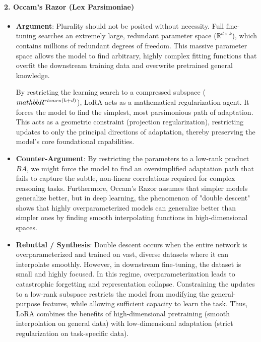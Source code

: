 \documentclass{article}
\begin{document}
\paragraph{2. Occam's Razor (Lex Parsimoniae)}
\begin{itemize}
  \item \textbf{Argument}: Plurality should not be posited without necessity. Full fine-tuning searches an extremely large, redundant parameter space ($\mathbb{R}^{d \times k}$), which contains millions of redundant degrees of freedom. This massive parameter space allows the model to find arbitrary, highly complex fitting functions that overfit the downstream training data and overwrite pretrained general knowledge.
  
  By restricting the learning search to a compressed subspace ($\\mathbb{R}^{r \\times (k+d)}$), LoRA acts as a mathematical regularization agent. It forces the model to find the simplest, most parsimonious path of adaptation. This acts as a geometric constraint (projection regularization), restricting updates to only the principal directions of adaptation, thereby preserving the model's core foundational capabilities.
  
  \item \textbf{Counter-Argument}: By restricting the parameters to a low-rank product $BA$, we might force the model to find an oversimplified adaptation path that fails to capture the subtle, non-linear correlations required for complex reasoning tasks. Furthermore, Occam's Razor assumes that simpler models generalize better, but in deep learning, the phenomenon of "double descent" shows that highly overparameterized models can generalize better than simpler ones by finding smooth interpolating functions in high-dimensional spaces.
  
  \item \textbf{Rebuttal / Synthesis}: Double descent occurs when the entire network is overparameterized and trained on vast, diverse datasets where it can interpolate smoothly. However, in downstream fine-tuning, the dataset is small and highly focused. In this regime, overparameterization leads to catastrophic forgetting and representation collapse. Constraining the updates to a low-rank subspace restricts the model from modifying the general-purpose features, while allowing sufficient capacity to learn the task. Thus, LoRA combines the benefits of high-dimensional pretraining (smooth interpolation on general data) with low-dimensional adaptation (strict regularization on task-specific data).
\end{itemize}
\end{document}
